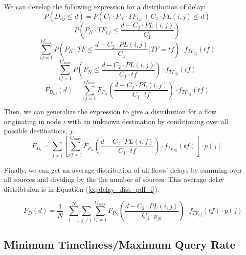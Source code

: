 We can develop the following expression for a distribution of delay:
\begin{equation*}
	P( D_{i | j} \leq d ) = P( C_1 \cdot P_N \cdot TF_{i | j} + C_2 \cdot PL(i,j) \leq d )
\end{equation*}
\begin{equation*}
	P( P_N \cdot TF_{i | j} \leq \frac{d - C_2 \cdot PL(i,j)}{C_1}  )
\end{equation*}
\begin{equation*}
	\sum\limits_{tf = 1}^{tf_{max}} P( P_N \cdot TF \leq \frac{d - C_2 \cdot PL(i,j)}{C_1} | TF = tf ) \cdot f_{TF_{i | j}}(tf)
\end{equation*}
\begin{equation*}
	\sum\limits_{tf = 1}^{tf_{max}} P( P_N \leq \frac{d - C_2 \cdot PL(i,j)}{C_1 \cdot tf} ) \cdot f_{TF_{i | j}}(tf)
\end{equation*}
\begin{equation*}
	F_{D_{i|j}}(d) = \sum\limits_{tf = 1}^{tf_{max}} F_{P_N}( \frac{d - C_2 \cdot PL(i,j)}{C_1 \cdot tf} ) \cdot f_{TF_{i | j}}(tf)
\end{equation*}


Then, we can generalize the expression to give a distribution for a flow originating in node $i$ with an unknown destination by conditioning over all possible destinations, $j$.
\begin{equation}
\label{eq:delay_dist_pdf_i}
	F_{D_i} = \sum\limits_{j \neq i} [ \sum\limits_{tf = 1}^{tf_{max}} F_{P_N}( \frac{d - C_2 \cdot PL(i,j)}{C_1 \cdot tf} ) \cdot f_{TF_{i | j}}(tf) ] \cdot p(j)
\end{equation}

Finally, we can get an average distribution of all flows' delays by summing over all sources and dividing by the the number of sources.  This average delay distribtuion is in Equation (\ref{eq:delay_dist_pdf_i}).

\begin{figure}
\begin{equation}
\label{eq:full_delay_cdf}
	F_D(d) = \frac{1}{N} \cdot \sum\limits_{i = 1}^N \sum\limits_{j \neq i} \sum\limits_{tf=1}^{tf_{max}}  F_{P_N}( \frac{d - C_2 \cdot PL(i,j)}{C_1 \cdot p_N} ) \cdot f_{TF_{i | j}}( tf ) \cdot p(j)
\end{equation}
\end{figure}

\subsection{Minimum Timeliness/Maximum Query Rate}

